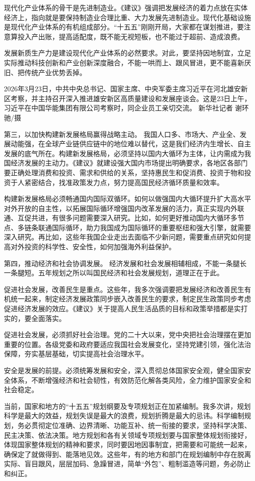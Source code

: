 \documentclass[UTF8,zihao=-4]{ctexart}
\begin{document}
现代化产业体系的骨干是先进制造业。《建议》强调把发展经济的着力点放在实体经济上，指向就是要保持制造业合理比重、大力发展先进制造业。现代化基础设施是现代化产业体系的有机组成部分。“十五五”刚刚开局，大家都在谋划推进，要注意算投入产出账，提高适配度，既不能无视短板，也不能过于超前、造成浪费。

发展新质生产力是建设现代化产业体系的必然要求。对此，要坚持因地制宜，立足实际推动科技创新和产业创新深度融合，不能一哄而上、跟风冒进，更不能喜新厌旧、把传统产业优势丢掉。

2026年3月23日，中共中央总书记、国家主席、中央军委主席习近平在河北雄安新区考察，并主持召开深入推进雄安新区高质量建设和发展座谈会。这是23日上午，习近平在中国华能集团有限公司考察时，同企业员工亲切交流。 新华社记者 谢环驰/摄

第三，以加快构建新发展格局赢得战略主动。 我国人口多、市场大、产业全、发展动能强，在全球产业链供应链中的地位难以替代，这是我们经济内生增长、自主发展的底气所在。构建新发展格局，必须坚持以国内大循环为主体，让内需成为我国经济发展的主动力。《建议》就建设强大国内市场提出明确要求，各地区各部门要正确处理消费和投资、需求和供给的关系，坚持惠民生和促消费、投资于物和投资于人紧密结合，找准政策发力点，努力提高国民经济循环质量和效率。

构建新发展格局必须畅通国内国际双循环。如何以做强国内大循环提升扩大高水平对外开放的自主性，以拓展国际循环增强国内改革发展的活力，真正实现内外联通、互促共进，有很多问题需要深入研究。比如，如何更好推动国内大循环多节点、多链条联通国际循环，助力我国成为国际循环的重要枢纽和强大引擎，就需要深入研究。再比如，这些年我国企业走出去面临不少新问题，需要重点研究如何提高对外投资的科学性、安全性，如何加强海外利益保护。

第四，推动经济和社会协调发展。 经济发展和社会发展相辅相成，不能一条腿长一条腿短。五年规划之所以叫国民经济和社会发展规划，道理正在于此。

促进社会发展，改善民生是重点。这些年，我多次强调要把发展经济和改善民生有机统一起来，制定经济发展政策同步嵌入改善民生的要求，制定民生政策同步考虑促进经济发展的效应。《建议》关于提高人民生活品质的目标和政策举措都是实打实的，要全面落实。

促进社会发展，必须抓好社会治理。党的二十大以来，党中央把社会治理摆在更加重要的位置。各级党委和政府要适应我国社会发展变化，坚持党建引领，强化法治保障，夯实基层基础，切实提高社会治理水平。

安全是发展的前提。必须统筹发展和安全，深入贯彻总体国家安全观，健全国家安全体系，不断增强经济和社会韧性，有效防范化解各类风险，全力维护国家安全和社会稳定。

当前，国家和地方的“十五五”规划纲要及专项规划正在加紧编制。我多次讲，规划科学是最大的效益，规划失误是最大的浪费，规划折腾是最大的忌讳。科学编制规划，务必贯彻定位准确、边界清晰、功能互补、统一衔接的要求，坚持科学决策、民主决策、依法决策。地方规划和各有关领域专项规划要与国家整体规划衔接好，体现国家整体规划的精神和要求，同时要因地因事制宜，把需要和可能统一起来，确保定了就做得到、能落地见效。这些年，有的地方和部门在规划编制中存在脱离实际、盲目跟风，层层加码、急躁冒进，简单“外包”、粗制滥造等问题，务必防止和纠正。
\end{document}
